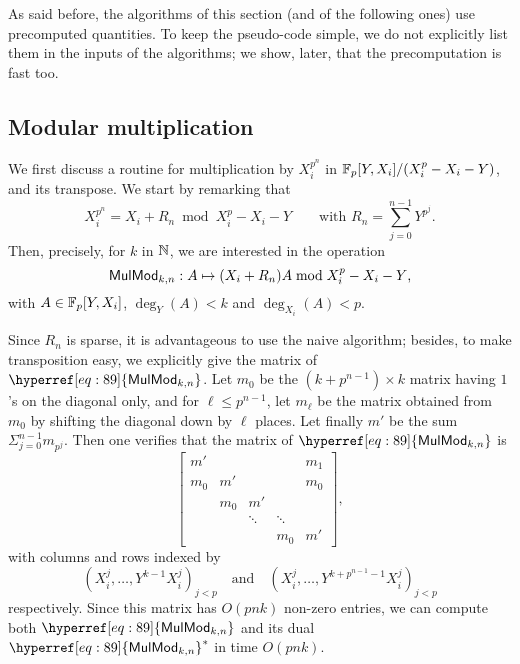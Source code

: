 As said before, the algorithms of this section (and of the following
ones) use precomputed quantities. To keep the pseudo-code simple, we
do not explicitly list them in the inputs of the algorithms;
we show, later, that the precomputation is fast too.


\subsection{Modular multiplication}
\label{ssec:mulmod}

We first discuss a routine for multiplication by $X_i^{p^n}$
in $\mathbb{F}_p[Y,X_i]/(X_i^p-X_i-Y)$, and its transpose. We start by
remarking that 
\begin{equation}
  \label{eq:Kn}
  X_i^{p^n}=X_i+R_n \bmod X_i^p-X_i-Y \qquad\text{with }
  R_n = \sum_{j=0}^{n-1} Y^{p^j}
  \text{.}
\end{equation}
Then, precisely, for $k$ in $\mathbb{N}$, we are interested in the operation
\begin{equation}
  \label{eq:89}
  {\sf MulMod}_{k,n}: A \mapsto (X_i+R_n)A \bmod X_i^p-X_i-Y
  \text{,}  
\end{equation}
with $A\in \mathbb{F}_p[Y,X_i]$, $\deg_Y(A) < k$ and $\deg_{X_i}(A) <p$.

Since $R_n$ is sparse, it is advantageous to use the naive algorithm;
besides, to make transposition easy, we explicitly give the matrix of
$\hyperref[eq:89]{\alg{MulMod}_{k,n}}$. Let $m_0$ be the
$(k+p^{n-1})\times k$ matrix having $1$'s on the diagonal only, and
for $\ell \le p^{n-1}$, let $m_\ell$ be the matrix obtained from $m_0$
by shifting the diagonal down by $\ell$ places. Let finally $m'$ be
the sum $\Sigma_{j=0}^{n-1} m_{p^j}$. Then one verifies that the
matrix of $\hyperref[eq:89]{\alg{MulMod}_{k,n}}$ is $$\left [
\begin{matrix}
m'  &     &        &        & m_1 \\
m_0 & m'  &        &        & m_0 \\
    & m_0 & m'     &        &     \\
    &     & \ddots & \ddots &     \\
    &     &        & m_0    & m'
\end{matrix}
\right ],$$ 
with columns and rows indexed by 
\begin{equation}
  \label{eq:90}
  (X_i^j,\dots,Y^{k-1}X_i^j)_{j < p}
  \quad\text{and}\quad
  (X_i^j,\dots,Y^{k+p^{n-1}-1}X_i^j)_{j < p}  
\end{equation}
respectively.  Since this matrix has $O(pnk)$ non-zero entries, we can
compute both $\hyperref[eq:89]{\alg{MulMod}_{k,n}}$ and its dual
$\dual{\hyperref[eq:89]{\alg{MulMod}_{k,n}}}$ in time $O(pnk)$.


